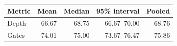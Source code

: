 \par\begin{center}\begin{minipage}{\linewidth}\def\@captype{table}
\centering
\caption{Historical endpoint reductions (percent) across 200 backend--seed pairs. The last column measures reduction of pooled means; the preceding columns summarize paired reductions.}
\label{tab:metriq}
\begin{tabular}{lrrrr}
\toprule
Metric & Mean & Median & 95\% interval & Pooled \\
\midrule
Depth & 66.67 & 68.75 & 66.67--70.00 & 68.76 \\
Gates & 74.01 & 75.00 & 73.67--76.47 & 75.86 \\
\bottomrule
\end{tabular}
\end{minipage}\end{center}\par
